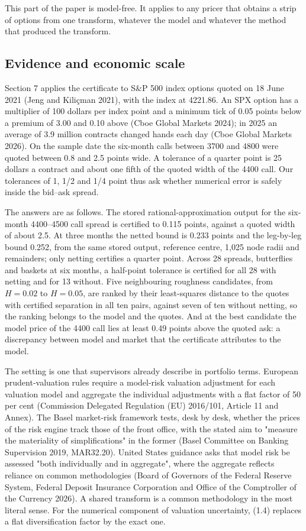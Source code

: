 \documentclass[11pt,a4paper]{article}
\begin{document}
This part of the paper is model-free. It applies to any pricer that obtains a strip of options from one transform, whatever the model and whatever the method that produced the transform.

\setcounter{subsection}{2}\subsection{Evidence and economic scale}

Section 7 applies the certificate to S\&P 500 index options quoted on 18 June 2021 (Jeng and Kiliçman 2021), with the index at 4221.86. An SPX option has a multiplier of 100 dollars per index point and a minimum tick of 0.05 points below a premium of 3.00 and 0.10 above (Cboe Global Markets 2024); in 2025 an average of 3.9 million contracts changed hands each day (Cboe Global Markets 2026). On the sample date the six-month calls between 3700 and 4800 were quoted between 0.8 and 2.5 points wide. A tolerance of a quarter point is 25 dollars a contract and about one fifth of the quoted width of the 4400 call. Our tolerances of 1, 1/2 and 1/4 point thus ask whether numerical error is safely inside the bid–ask spread.

The answers are as follows. The stored rational-approximation output for the six-month 4400–4500 call spread is certified to 0.115 points, against a quoted width of about 2.5. At three months the netted bound is 0.233 points and the leg-by-leg bound 0.252, from the same stored output, reference centre, 1,025 node radii and remainders; only netting certifies a quarter point. Across 28 spreads, butterflies and baskets at six months, a half-point tolerance is certified for all 28 with netting and for 13 without. Five neighbouring roughness candidates, from \(H=0.02\) to \(H=0.05\), are ranked by their least-squares distance to the quotes with certified separation in all ten pairs, against seven of ten without netting, so the ranking belongs to the model and the quotes. And at the best candidate the model price of the 4400 call lies at least 0.49 points above the quoted ask: a discrepancy between model and market that the certificate attributes to the model.

The setting is one that supervisors already describe in portfolio terms. European prudent-valuation rules require a model-risk valuation adjustment for each valuation model and aggregate the individual adjustments with a flat factor of 50 per cent (Commission Delegated Regulation (EU) 2016/101, Article 11 and Annex). The Basel market-risk framework tests, desk by desk, whether the prices of the risk engine track those of the front office, with the stated aim to "measure the materiality of simplifications" in the former (Basel Committee on Banking Supervision 2019, MAR32.20). United States guidance asks that model risk be assessed "both individually and in aggregate", where the aggregate reflects reliance on common methodologies (Board of Governors of the Federal Reserve System, Federal Deposit Insurance Corporation and Office of the Comptroller of the Currency 2026). A shared transform is a common methodology in the most literal sense. For the numerical component of valuation uncertainty, (1.4) replaces a flat diversification factor by the exact one.
\end{document}
